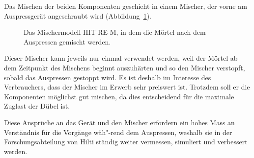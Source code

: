 Das Mischen der beiden Komponenten geschieht in einem Mischer, der vorne am Auspressgerät angeschraubt wird (Abbildung~\ref{fig:Mischer}).
%
\begin{figure}
    \centering
    \caption{Das Mischermodell HIT-RE-M, in dem die Mörtel nach dem Auspressen gemischt werden.}
    \label{fig:Mischer}
\end{figure}
%
Dieser Mischer kann jeweils nur einmal verwendet werden, weil der Mörtel ab dem Zeitpunkt des Mischens beginnt auszuhärten und so den Mischer verstopft, sobald das Auspressen gestoppt wird. Es ist deshalb im Interesse des Verbrauchers, dass der Mischer im Erwerb sehr preiswert ist. Trotzdem soll er die Komponenten möglichst gut mischen, da dies entscheidend für die maximale Zuglast der Dübel ist.

Diese Ansprüche an das Gerät und den Mischer erfordern ein hohes Mass an Verständnis für die Vorgänge wäh"-rend dem Auspressen, weshalb sie in der Forschungsabteilung von Hilti ständig weiter vermessen, simuliert und verbessert werden.
%
